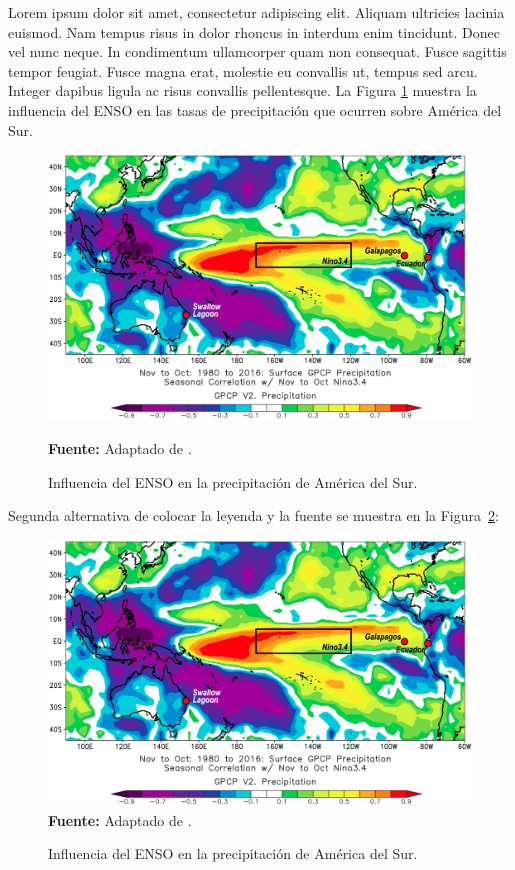 Lorem ipsum dolor sit amet, consectetur adipiscing elit. Aliquam ultricies lacinia euismod. Nam tempus risus in dolor rhoncus in interdum enim tincidunt. Donec vel nunc neque. In condimentum ullamcorper quam non consequat. Fusce sagittis tempor feugiat. Fusce magna erat, molestie eu convallis ut, tempus sed arcu. Integer dapibus ligula ac risus convallis pellentesque. La Figura \ref{fig-enso} muestra la influencia del ENSO en las tasas de precipitación que ocurren sobre América del Sur. 

\begin{figure}[H]
\centering
\includegraphics[width=1.0\textwidth]{Figuras/enso.png}
\vspace{-0.5cm}
\caption{Influencia del ENSO en la precipitación de América del Sur.}
\textbf{Fuente:} Adaptado de \cite{barr2019}.
\label{fig-enso}
\end{figure}

Segunda alternativa de colocar la leyenda y la fuente se muestra en la Figura~\ref{fig-enso2}:


\begin{figure}[H]
\centering
\caption{Influencia del ENSO en la precipitación de América del Sur.}
\includegraphics[width=1.0\textwidth]{Figuras/enso.png}
\vspace{-0.5cm}
\textbf{Fuente:} Adaptado de \cite{barr2019}.
\label{fig-enso2}
\end{figure}

